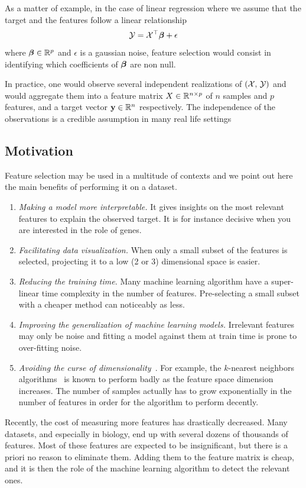 As a matter of example,
in the case of linear regression where we assume that the target and the features follow a linear relationship
\begin{equation*}
    \mathcal{Y} = \mathcal{X}^\top \bm{\beta} + \epsilon
\end{equation*}
where $\bm{\beta} \in \mathbb{R}^p$ and $\epsilon$ is a gaussian noise,
feature selection would consist in identifying which coefficients of $\bm{\beta}$ are non null.

In practice, one would observe several independent realizations of
$\left( \mathcal{X},\, \mathcal{Y} \right)$ and would aggregate them into a feature matrix
$X \in \mathbb{R}^{n \times p}$ of $n$ samples and $p$ features, and a target vector $\mathbf{y} \in \mathbb{R}^n$ respectively.
The independence of the observations is a credible assumption in many real life settings

\subsection{Motivation}\label{subsec:fs_motivation}

Feature selection may be used in a multitude of contexts and we point out here the main benefits of
performing it on a dataset.
\begin{enumerate}
    \item \textit{Making a model more interpretable.}
    It gives insights on the most relevant features to explain the observed target.
    It is for instance decisive when you are interested in the role of genes.
    \item \textit{Facilitating data visualization.}
    When only a small subset of the features is selected,
    projecting it to a low (2 or 3) dimensional space is easier.
    \item \textit{Reducing the training time.}
    Many machine learning algorithm have a super-linear time complexity in the number of features.
    Pre-selecting a small subset with a cheaper method can noticeably as less\citep{high_dimensional_fs}.
    \item \textit{Improving the generalization of machine learning models.}
    Irrelevant features may only be noise and fitting a model against them at train time
    is prone to over-fitting noise.
    \item \textit{Avoiding the curse of dimensionality}~\citep{curse_dimensionality}.
    For example, the $k$-nearest neighbors algorithms~\citep{knn} is known to perform badly as the feature space
    dimension increases.
    The number of samples actually has to grow exponentially in the number of features in order for the algorithm
    to perform decently.
\end{enumerate}
Recently, the cost of measuring more features has drastically decreased.
Many datasets, and especially in biology, end up with several dozens of thousands of features.
Most of these features are expected to be insignificant, but there is a priori no reason to eliminate them.
Adding them to the feature matrix is cheap, and it is then the role of the machine learning algorithm
to detect the relevant ones.

